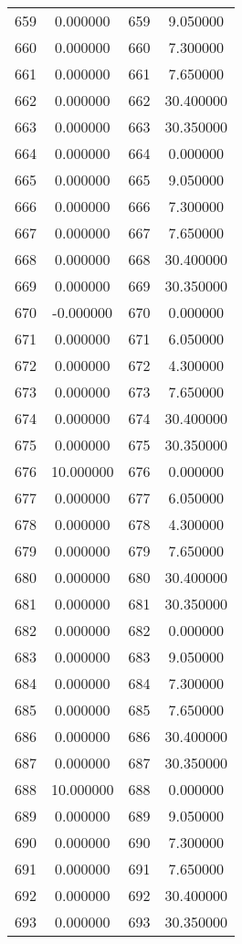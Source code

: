 \documentclass[12pt]{article}
\begin{document}
\begin{longtable}{@{}cccc@{}}
659 & 0.000000 & 659 & 9.050000 \\
660 & 0.000000 & 660 & 7.300000 \\
661 & 0.000000 & 661 & 7.650000 \\
662 & 0.000000 & 662 & 30.400000 \\
663 & 0.000000 & 663 & 30.350000 \\
664 & 0.000000 & 664 & 0.000000 \\
665 & 0.000000 & 665 & 9.050000 \\
666 & 0.000000 & 666 & 7.300000 \\
667 & 0.000000 & 667 & 7.650000 \\
668 & 0.000000 & 668 & 30.400000 \\
669 & 0.000000 & 669 & 30.350000 \\
670 & -0.000000 & 670 & 0.000000 \\
671 & 0.000000 & 671 & 6.050000 \\
672 & 0.000000 & 672 & 4.300000 \\
673 & 0.000000 & 673 & 7.650000 \\
674 & 0.000000 & 674 & 30.400000 \\
675 & 0.000000 & 675 & 30.350000 \\
676 & 10.000000 & 676 & 0.000000 \\
677 & 0.000000 & 677 & 6.050000 \\
678 & 0.000000 & 678 & 4.300000 \\
679 & 0.000000 & 679 & 7.650000 \\
680 & 0.000000 & 680 & 30.400000 \\
681 & 0.000000 & 681 & 30.350000 \\
682 & 0.000000 & 682 & 0.000000 \\
683 & 0.000000 & 683 & 9.050000 \\
684 & 0.000000 & 684 & 7.300000 \\
685 & 0.000000 & 685 & 7.650000 \\
686 & 0.000000 & 686 & 30.400000 \\
687 & 0.000000 & 687 & 30.350000 \\
688 & 10.000000 & 688 & 0.000000 \\
689 & 0.000000 & 689 & 9.050000 \\
690 & 0.000000 & 690 & 7.300000 \\
691 & 0.000000 & 691 & 7.650000 \\
692 & 0.000000 & 692 & 30.400000 \\
693 & 0.000000 & 693 & 30.350000 \\

\end{longtable}
\end{document}
